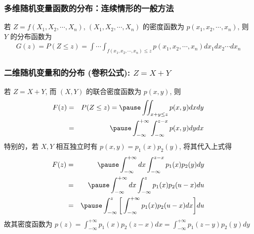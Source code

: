 \documentclass[Prob-All.tex]{subfiles}
\begin{document}
 \begin{frame}
 	\frametitle{多维随机变量函数的分布：连续情形的一般方法}
 	若 $Z=f (X_1,X_2,\cdots,X_n)$, $(X_1,X_2,\cdots,X_n)$ 的密度函数为 $p (x_1,x_2,\cdots,x_n)$, 则 $Y$ 的分布函数为
 	\begin{eqnarray*}
 		G(z)=P(Z\le z)=\int\cdots\int_{f(x_1,x_2,\cdots,x_n)\le z}p(x_1,x_2,\cdots,x_n)dx_1dx_2\cdots dx_n
 	\end{eqnarray*}

 \end{frame}
 \begin{frame}
 	\frametitle{二维随机变量和的分布 (卷积公式): $Z=X+Y$}
 	\begin{thm}
 		若 $Z=X+Y$, 而 $(X,Y)$ 的联合密度函数为 $p (x,y)$, 则
 		\begin{eqnarray*}
 			F(z)&=&P(Z\le z)=\pause \iint_{x+y\le z}p(x,y)dxdy\\
 			&=&\pause \int_{-\infty}^{+\infty}\int_{-\infty}^{z-x}p(x,y)dydx
 		\end{eqnarray*}
 		\pause 特别的，若 $X,Y$ 相互独立时有 $p (x,y)=p_1 (x) p_2 (y)$, 将其代入上式得 %
 		\pause \begin{eqnarray*}
 			F(z)&=&\pause \int_{-\infty}^{+\infty}dx\int_{-\infty}^{z-x}p_1(x)p_2(y)dy\\
 			&=& \pause  \int_{-\infty}^{+\infty}dx\int_{-\infty}^zp_1(x)p_2(u-x)du\\
 			&=& \pause  \int_{-\infty}^{z}\bigg[\int_{-\infty}^{+\infty}p_1(x)p_2(u-x)dx\bigg]du\\
 		\end{eqnarray*}
 		\pause 故其密度函数为 $p (z)=\int_{-\infty}^{+\infty} p_1 (x) p_2 (z-x) dx=\int_{-\infty}^{+\infty} p_1 (z-y) p_2 (y) dy$
 	\end{thm}
 \end{frame}
\end{document}
